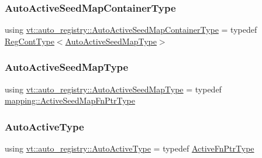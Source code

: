 \subsubsection{\texorpdfstring{Auto\+Active\+Seed\+Map\+Container\+Type}{AutoActiveSeedMapContainerType}}
{\footnotesize\ttfamily using \hyperlink{namespacevt_1_1auto__registry_ab66be9508a849981974eb0c5f9909ff4}{vt\+::auto\+\_\+registry\+::\+Auto\+Active\+Seed\+Map\+Container\+Type} = typedef \hyperlink{namespacevt_1_1auto__registry_a988a4943e4c8fe82b56f5b13bddceb2b}{Reg\+Cont\+Type}$<$\hyperlink{namespacevt_1_1auto__registry_a9b5f3bdf0a9a503806cfd4f2747c82f6}{Auto\+Active\+Seed\+Map\+Type}$>$}

\mbox{\label{namespacevt_1_1auto__registry_a9b5f3bdf0a9a503806cfd4f2747c82f6}} 
\subsubsection{\texorpdfstring{Auto\+Active\+Seed\+Map\+Type}{AutoActiveSeedMapType}}
{\footnotesize\ttfamily using \hyperlink{namespacevt_1_1auto__registry_a9b5f3bdf0a9a503806cfd4f2747c82f6}{vt\+::auto\+\_\+registry\+::\+Auto\+Active\+Seed\+Map\+Type} = typedef \hyperlink{namespacevt_1_1mapping_a254b50d55be91c3bd002481b2e96da7e}{mapping\+::\+Active\+Seed\+Map\+Fn\+Ptr\+Type}}

\mbox{\label{namespacevt_1_1auto__registry_adc4d91d5c7fe1b7d36f2c490ae14c9ac}} 
\subsubsection{\texorpdfstring{Auto\+Active\+Type}{AutoActiveType}}
{\footnotesize\ttfamily using \hyperlink{namespacevt_1_1auto__registry_adc4d91d5c7fe1b7d36f2c490ae14c9ac}{vt\+::auto\+\_\+registry\+::\+Auto\+Active\+Type} = typedef \hyperlink{namespacevt_a70e19bd64d031e65083c2125b2c65426}{Active\+Fn\+Ptr\+Type}}

\mbox{\label{namespacevt_1_1auto__registry_a39e866b6d2db660ab9cd9f7cacfa5595}} 
